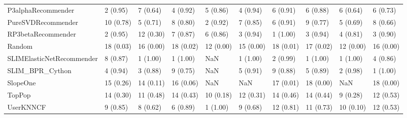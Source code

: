 \begin{tabular}{llllllllll}
                 P3alphaRecommender &                 2 (0.95) &    7 (0.64) &      4 (0.92) &     5 (0.86) &             4 (0.94) &            6 (0.91) &          6 (0.88) &           6 (0.64) &          6 (0.73) \\
                 PureSVDRecommender &                10 (0.78) &    5 (0.71) &      8 (0.80) &     2 (0.92) &             7 (0.85) &            6 (0.91) &          9 (0.77) &           5 (0.69) &          8 (0.66) \\
                 RP3betaRecommender &                 2 (0.95) &   12 (0.30) &      7 (0.87) &     6 (0.86) &             3 (0.94) &            1 (1.00) &          3 (0.94) &           4 (0.81) &          3 (0.90) \\
                             Random &                18 (0.03) &   16 (0.00) &     18 (0.02) &    12 (0.00) &            15 (0.00) &           18 (0.01) &         17 (0.02) &          12 (0.00) &         16 (0.00) \\
          SLIMElasticNetRecommender &                 8 (0.87) &    1 (1.00) &      1 (1.00) &          NaN &             1 (1.00) &            2 (0.99) &          1 (1.00) &           1 (1.00) &          4 (0.86) \\
                    SLIM\_BPR\_Cython &                 4 (0.94) &    3 (0.88) &      9 (0.75) &          NaN &             5 (0.91) &            9 (0.88) &          5 (0.89) &           2 (0.98) &          1 (1.00) \\
                           SlopeOne &                15 (0.26) &   14 (0.11) &     16 (0.06) &          NaN &                  NaN &           17 (0.01) &         18 (0.00) &                NaN &         18 (0.00) \\
                             TopPop &                14 (0.30) &   11 (0.48) &     14 (0.43) &    10 (0.18) &            12 (0.31) &           14 (0.46) &         14 (0.44) &           9 (0.28) &         12 (0.53) \\
                          UserKNNCF &                 9 (0.85) &    8 (0.62) &      6 (0.89) &     1 (1.00) &             9 (0.68) &           12 (0.81) &         11 (0.73) &          10 (0.10) &         12 (0.53) \\
\bottomrule
\end{tabular}
